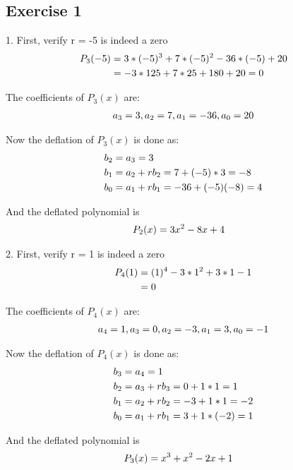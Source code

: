 \documentclass[12pt]{article}
\begin{document}
\subsection{Exercise 1}

1. First, verify r = -5 is indeed a zero
\begin{align}
P_3(-5) &= 3*(-5)^3 + 7*(-5)^2 - 36*(-5) + 20 \notag \\
&=-3*125 + 7*25 + 180 + 20 = 0 \notag
\end{align}

The coefficients of $P_3(x)$ are:
\begin{align}
a_3 = 3, a_2 = 7, a_1 = -36, a_0 = 20 \notag
\end{align}

Now the deflation of $P_3(x)$ is done as:
\begin{align}
b_2 &= a_3 = 3 \notag \\
b_1 &= a_2 + rb_2 = 7 + (-5)*3 = -8 \notag \\
b_0 &= a_1 + rb_1 = -36 + (-5)(-8) = 4 \notag
\end{align}

And the deflated polynomial is
\begin{align}
P_2(x) &= 3x^2 - 8x + 4 \notag
\end{align}

2. First, verify r = 1 is indeed a zero
\begin{align}
P_4(1) &= (1)^4 - 3*1^2 + 3* 1 - 1 \notag \\
&= 0 \notag
\end{align}

The coefficients of $P_4(x)$ are:
\begin{align}
a_4 = 1, a_3 = 0, a_2 = -3, a_1 = 3, a_0 = -1 \notag
\end{align}

Now the deflation of $P_4(x)$ is done as:
\begin{align}
b_3 &= a_4 = 1 \notag \\
b_2 &= a_3 + rb_3 = 0 + 1*1 = 1 \notag \\
b_1 &= a_2 + rb_2 = -3 + 1*1 = -2 \notag \\
b_0 &= a_1 + rb_1 = 3 + 1*(-2) = 1 \notag
\end{align}


And the deflated polynomial is
\begin{align}
P_3(x) &= x^3 + x^2 - 2x + 1 \notag
\end{align}
\end{document}
